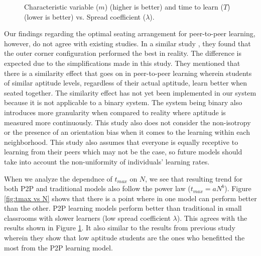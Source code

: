 \documentclass[10pt,a4paper,twoside]{article}
\begin{document}
\begin{figure}[h]
  \quad %
  \caption{Characteristic variable ($m$) (higher is better) and time to learn ($T$) (lower is better) vs. Spread coefficient ($\lambda$).}
  \label{fig:TTL and m vs lambda}
\end{figure}

\noindent Our findings regarding the optimal seating arrangement for peer-to-peer learning, however, do not agree with existing studies. In a similar study \cite{roxas2010seating}, they found that the outer corner configuration performed the best in reality. The difference is expected due to the simplifications made in this study. They mentioned that there is a similarity effect that goes on in peer-to-peer learning wherein students of similar aptitude levels, regardless of their actual aptitude, learn better when seated together. The similarity effect has not yet been implemented in our system because it is not applicable to a binary system. The system being binary also introduces more granularity when compared to reality where aptitude is measured more continuously. This study also does not consider the non-isotropy or the presence of an orientation bias when it comes to the learning within each neighborhood. This study also assumes that everyone is equally receptive to learning from their peers which may not be the case, so future models should take into account the non-uniformity of individuals’ learning rates.


\noindent When we analyze the dependnce of $t_{max}$ on $N$, we see that resulting trend for both P2P and traditional models also follow the power law ($t_{max}=aN^b$). Figure \ref{fig:tmax vs N} shows that there is a point where in one model can perform better than the other. P2P learning models perform better than traditional in small classrooms with slower learners (low spread coefficient $\lambda$). This agrees with the results shown in Figure \ref{fig:TTL and m vs lambda}. It also similar to the results from previous study \cite{roxas2010seating} wherein they show that low aptitude students are the ones who benefitted the most from the P2P learning model.
\end{document}
